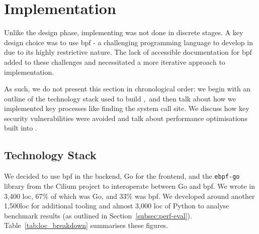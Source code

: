 \section{Implementation}\label{sec:implementation}

Unlike the design phase, implementing \af was not done in discrete
stages. A key design choice was to use \ac{bpf} - a challenging programming language
to develop in due to its highly restrictive nature. The lack of accessible
documentation for \ac{bpf} added to these challenges and necessitated a more
iterative approach to implementation.

As such, we do not present this section in chronological order: we begin with
an outline of the technology stack used to build \afss,~and then talk about how
we implemented key processes like finding the system call site. We discuss 
how key security vulnerabilities were avoided and talk about performance 
optimisations built into \af.

\subsection{Technology Stack}\label{subsection:tech-stack}

We decided to use \ac{bpf} in the backend, Go for the frontend, and the
\texttt{ebpf-go} library from the Cilium project to interoperate between Go and
\ac{bpf}. We wrote \af in 3,400 \ac{loc}, 67\% of which was Go, and 33\% was 
\ac{bpf}. We developed around another 1,500\ac{loc} for additional tooling and
almost 3,000 \ac{loc} of Python to analyse benchmark results (as outlined in
Section~\ref{subsec:perf-eval}). Table~\ref{tab:loc_breakdown} summarises these figures.

